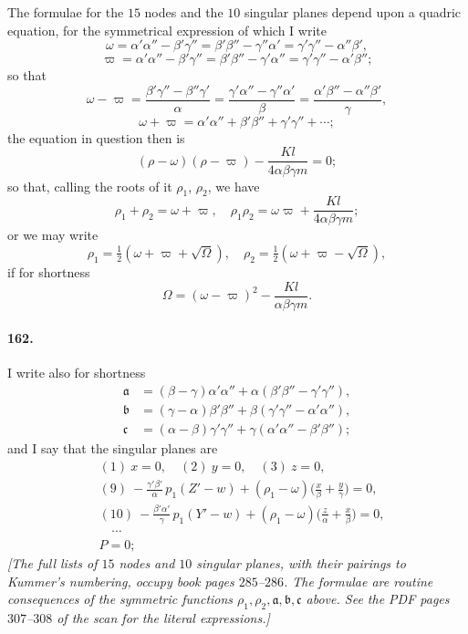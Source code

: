 \documentclass[11pt,a4paper]{article}
\begin{document}
The formulae for the $15$ nodes and the $10$ singular planes depend upon
a quadric equation, for the symmetrical expression of which I write
\[
\omega = \alpha'\alpha'' - \beta'\gamma'' = \beta'\beta'' - \gamma''\alpha'
= \gamma'\gamma'' - \alpha''\beta',
\]
\[
\varpi = \alpha'\alpha'' - \beta'\gamma'' = \beta'\beta'' - \gamma'\alpha''
= \gamma'\gamma'' - \alpha'\beta'';
\]
so that
\[
\omega - \varpi = \frac{\beta'\gamma'' - \beta''\gamma'}{\alpha}
= \frac{\gamma'\alpha'' - \gamma''\alpha'}{\beta}
= \frac{\alpha'\beta'' - \alpha''\beta'}{\gamma},
\]
\[
\omega + \varpi = \alpha'\alpha'' + \beta'\beta'' + \gamma'\gamma''
+ \dotsb;
\]
the equation in question then is
\[
(\rho - \omega)(\rho - \varpi) - \frac{Kl}{4\alpha\beta\gamma m} = 0;
\]
so that, calling the roots of it $\rho_1$, $\rho_2$, we have
\[
\rho_1 + \rho_2 = \omega + \varpi,\quad
\rho_1 \rho_2 = \omega \varpi + \frac{Kl}{4\alpha\beta\gamma m};
\]
or we may write
\[
\rho_1 = \tfrac{1}{2}(\omega + \varpi + \sqrt{\Omega}),\quad
\rho_2 = \tfrac{1}{2}(\omega + \varpi - \sqrt{\Omega}),
\]
if for shortness
\[
\Omega = (\omega - \varpi)^2 - \frac{Kl}{\alpha\beta\gamma m}.
\]

\paragraph{162.}
I write also for shortness
\[
\begin{aligned}
\mathfrak{a} &= (\beta - \gamma)\alpha'\alpha'' + \alpha(\beta'\beta'' - \gamma'\gamma''), \\
\mathfrak{b} &= (\gamma - \alpha)\beta'\beta'' + \beta(\gamma'\gamma'' - \alpha'\alpha''), \\
\mathfrak{c} &= (\alpha - \beta)\gamma'\gamma'' + \gamma(\alpha'\alpha'' - \beta'\beta'');
\end{aligned}
\]
and I say that the singular planes are
\[
\begin{aligned}
&(1)\ x = 0,\quad (2)\ y = 0,\quad (3)\ z = 0, \\
&(9)\ -\tfrac{\gamma'\beta'}{\alpha}\, p_1 (Z' - w) + (\rho_1 - \omega)\bigl(\tfrac{x}{\beta} + \tfrac{y}{\gamma}\bigr) = 0, \\
&(10)\ -\tfrac{\beta'\alpha'}{\gamma}\, p_1 (Y' - w) + (\rho_1 - \omega)\bigl(\tfrac{z}{\alpha} + \tfrac{x}{\beta}\bigr) = 0, \\
&\quad \dotsb \\
&P = 0;
\end{aligned}
\]
\textit{[The full lists of $15$ nodes and $10$ singular planes, with
their pairings to Kummer's numbering, occupy book pages $285$--$286$. The
formulae are routine consequences of the symmetric functions
$\rho_1, \rho_2, \mathfrak{a}, \mathfrak{b}, \mathfrak{c}$ above. See the
PDF pages $307$--$308$ of the scan for the literal expressions.]}
\end{document}
